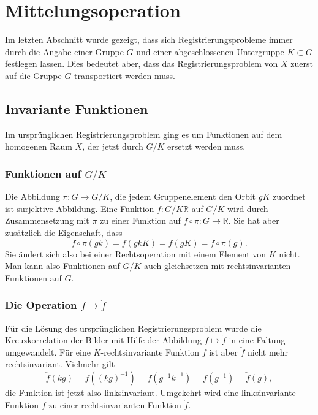 %
%
%
\section{Mittelungsoperation
\label{buch:nichtkomm:section:mittelung}}
Im letzten Abschnitt wurde gezeigt, dass sich Registrierungsprobleme
immer durch die Angabe einer Gruppe $G$ und einer abgeschlossenen
Untergruppe $K\subset G$ festlegen lassen.
Dies bedeutet aber, dass das Registrierungsproblem von $X$ zuerst
auf die Gruppe $G$ transportiert werden muss.

%
%
\subsection{Invariante Funktionen}
Im ursprünglichen Registrierungsproblem ging es um Funktionen auf
dem homogenen Raum $X$, der jetzt durch $G/K$ ersetzt werden muss.

%
%
\subsubsection{Funktionen auf $G/K$}
Die Abbildung $\pi\colon G\to G/K$, die jedem Gruppenelement den Orbit $gK$
zuordnet ist surjektive Abbildung.
Eine Funktion $f\colon G/K\mathbb{R}$ auf $G/K$ wird durch Zusammensetzung
mit $\pi$ zu einer Funktion auf $f\circ\pi\colon G\to\mathbb{R}$.
Sie hat aber zusätzlich die Eigenschaft, dass
\[
f\circ\pi(gk) = f(gkK) = f(gK) = f\circ \pi (g).
\]
Sie ändert sich also bei einer Rechtsoperation mit einem Element
von $K$ nicht.
Man kann also Funktionen auf $G/K$ auch gleichsetzen mit rechtsinvarianten
Funktionen auf $G$.

%
%
\subsubsection{Die Operation $f\mapsto\check{f}$}
Für die Lösung des ursprünglichen Registrierungsproblem wurde die
Kreuzkorrelation der Bilder mit Hilfe der Abbildung $f\mapsto \check{f}$
in eine Faltung umgewandelt.
Für eine $K$-rechtsinvariante Funktion $f$ ist aber $\check{f}$ nicht
mehr rechtsinvariant.
Vielmehr gilt
\[
\check{f}(kg)
=
f((kg)^{-1})
=
f(g^{-1}k^{-1})
=
f(g^{-1})
=
\check{f}(g),
\]
die Funktion ist jetzt also linksinvariant.
Umgekehrt wird eine linksinvariante Funktion $f$ zu einer
rechtsinvarianten Funktion $\check{f}$.

